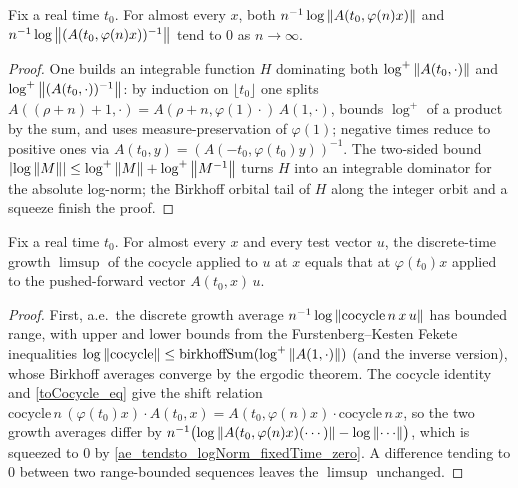 \begin{lemma}\label{ae_tendsto_logNorm_fixedTime_zero}
  \leanok
  Fix a real time \( t_0 \). For almost every \( x \), both
  \( n^{-1}\log\left\lVert A(t_0, \varphi(n)x) \right\rVert \) and \( n^{-1}\log\left\lVert (A(t_0, \varphi(n)x))^{-1} \right\rVert \)
  tend to \( 0 \) as \( n \to \infty \).
\end{lemma}
\begin{proof}\leanok
  One builds an integrable function \( H \) dominating both \( \log^{+}\left\lVert A(t_0,\cdot) \right\rVert \) and
  \( \log^{+}\left\lVert (A(t_0,\cdot))^{-1} \right\rVert \): by induction on \( \lfloor t_0 \rfloor \) one splits
  \( A((\rho+n)+1,\cdot) = A(\rho+n,\varphi(1)\cdot)\,A(1,\cdot) \), bounds \( \log^{+} \) of a
  product by the sum, and uses measure-preservation of \( \varphi(1) \); negative times reduce to
  positive ones via \( A(t_0,y) = (A(-t_0,\varphi(t_0)y))^{-1} \). The two-sided bound
  \( \left\lvert \log\left\lVert M \right\rVert \right\rvert \le \log^{+}\left\lVert M \right\rVert + \log^{+}\left\lVert M^{-1} \right\rVert \) turns \( H \) into an
  integrable dominator for the absolute log-norm; the Birkhoff orbital tail of \( H \) along the
  integer orbit and a squeeze finish the proof.
\end{proof}

\begin{theorem}\label{glim_shift}
  \leanok
  Fix a real time \( t_0 \). For almost every \( x \) and every test vector \( u \), the
  discrete-time growth \( \limsup \) of the cocycle applied to \( u \) at \( x \) equals that at
  \( \varphi(t_0)x \) applied to the pushed-forward vector \( A(t_0,x)\, u \).
\end{theorem}
\begin{proof}\leanok
  First, a.e.\ the discrete growth average \( n^{-1}\log\left\lVert \mathrm{cocycle}\,n\,x\,u \right\rVert \) has
  bounded range, with upper and lower bounds from the Furstenberg--Kesten Fekete inequalities
  \( \log\left\lVert \mathrm{cocycle} \right\rVert \le \mathrm{birkhoffSum}(\log^{+}\left\lVert A(1,\cdot) \right\rVert) \) (and the
  inverse version), whose Birkhoff averages converge by the ergodic theorem. The cocycle identity
  and \ref{toCocycle_eq} give the shift relation
  \( \mathrm{cocycle}\,n\,(\varphi(t_0)x)\cdot A(t_0,x) = A(t_0,\varphi(n)x)\cdot \mathrm{cocycle}\,n\,x \),
  so the two growth averages differ by \( n^{-1}\bigl(\log\norm{A(t_0,\varphi(n)x)(\cdots)} - \log\norm{\cdots}\bigr) \),
  which is squeezed to \( 0 \) by \ref{ae_tendsto_logNorm_fixedTime_zero}. A difference tending to
  \( 0 \) between two range-bounded sequences leaves the \( \limsup \) unchanged.
\end{proof}

